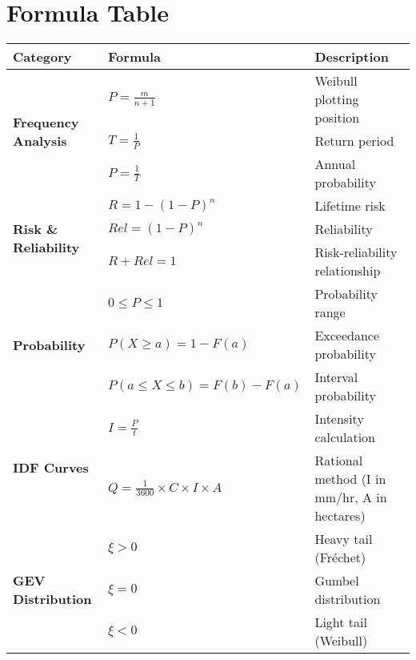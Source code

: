 \documentclass[11pt,a4paper]{article}
\begin{document}
\newpage

\section*{Formula Table}

\renewcommand{\arraystretch}{1.5}
\begin{tabular}{|l|l|l|}
\hline
\textbf{Category} & \textbf{Formula} & \textbf{Description} \\
\hline
\multirow{3}{*}{\textbf{Frequency Analysis}}
& $P = \frac{m}{n+1}$ & Weibull plotting position \\
& $T = \frac{1}{P}$ & Return period \\
& $P = \frac{1}{T}$ & Annual probability \\
\hline
\multirow{3}{*}{\textbf{Risk \& Reliability}}
& $R = 1-(1-P)^n$ & Lifetime risk \\
& $Rel = (1-P)^n$ & Reliability \\
& $R + Rel = 1$ & Risk-reliability relationship \\
\hline
\multirow{3}{*}{\textbf{Probability}}
& $0 \leq P \leq 1$ & Probability range \\
& $P(X \geq a) = 1 - F(a)$ & Exceedance probability \\
& $P(a \leq X \leq b) = F(b) - F(a)$ & Interval probability \\
\hline
\multirow{2}{*}{\textbf{IDF Curves}}
& $I = \frac{P}{t}$ & Intensity calculation \\
& $Q = \frac{1}{3600} \times C \times I \times A$ & Rational method (I in mm/hr, A in hectares) \\
\hline
\multirow{3}{*}{\textbf{GEV Distribution}}
& $\xi > 0$ & Heavy tail (Fréchet) \\
& $\xi = 0$ & Gumbel distribution \\
& $\xi < 0$ & Light tail (Weibull) \\
\hline
\end{tabular}

\vspace{0.5cm}
\end{document}
